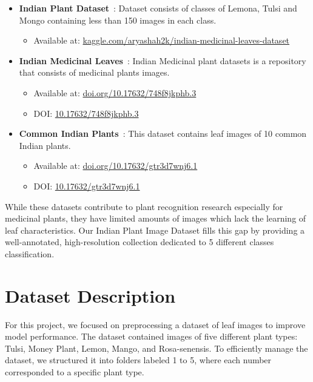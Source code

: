 \documentclass[twocolumn]{article}
\begin{document}
\begin{itemize}\itemsep4pt
    \item \textbf{Indian Plant Dataset}~\cite{aryashah2k2021}: Dataset consists of classes of Lemona, Tulsi and Mongo containing less than 150 images in each class.
    \begin{itemize}\itemsep2pt
        \item Available at: \href{https://www.kaggle.com/datasets/aryashah2k/indian-medicinal-leaves-dataset}{kaggle.com/aryashah2k/indian-medicinal-leaves-dataset}
    \end{itemize}
    
    \item \textbf{Indian Medicinal Leaves}~\cite{medicinal2023}: Indian Medicinal plant datasets is a repository that consists of medicinal plants images.
    \begin{itemize}\itemsep2pt
        \item Available at: \href{https://data.mendeley.com/datasets/748f8jkphb/3}{doi.org/10.17632/748f8jkphb.3}
        \item DOI: \href{https://doi.org/10.17632/748f8jkphb.3}{10.17632/748f8jkphb.3}
    \end{itemize}
    
    \item \textbf{Common Indian Plants}~\cite{common2022}: This dataset contains leaf images of 10 common Indian plants.
    \begin{itemize}\itemsep2pt
        \item Available at: \href{https://data.mendeley.com/datasets/gtr3d7wnj6/1}{doi.org/10.17632/gtr3d7wnj6.1}
        \item DOI: \href{https://doi.org/10.17632/gtr3d7wnj6.1}{10.17632/gtr3d7wnj6.1}
    \end{itemize}
\end{itemize}

While these datasets contribute to plant recognition research especially for medicinal plants, they have limited amounts of images which lack the learning of leaf characteristics. Our Indian Plant Image Dataset fills this gap by providing a well-annotated, high-resolution collection dedicated to 5 different classes classification.

\section{Dataset Description}
For this project, we focused on preprocessing a dataset of leaf images to improve model performance. The dataset contained images of five different plant types: Tulsi, Money Plant, Lemon, Mango, and Rosa-senensis. To efficiently manage the dataset, we structured it into folders labeled 1 to 5, where each number corresponded to a specific plant type.
\end{document}
